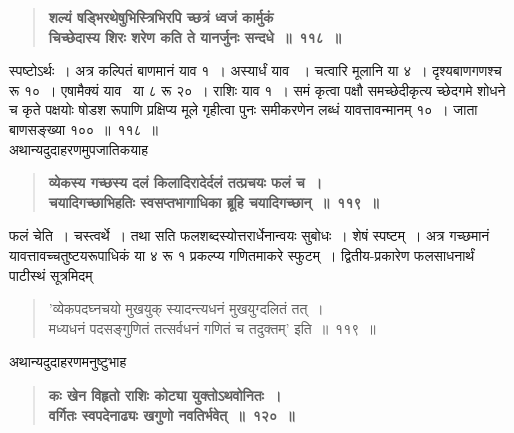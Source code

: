 \documentclass[11pt, openany]{book}
\begin{document}
\newpage

\begin{sloppypar}
 \label{8.118}
\begin{quote}
{\large \textbf{{\color{purple}शल्यं षड्भिरथेषुभिस्त्रिभिरपि च्छत्रं ध्वजं कार्मुकं\\
चिच्छेदास्य शिरः शरेण कति ते यानर्जुनः सन्दधे~॥~११८~॥}}}
\end{quote}

स्पष्टोऽर्थः~। अत्र कल्पितं बाणमानं याव १~। अस्यार्धं याव ~। चत्वारि मूलानि या ४~। दृश्यबाणगणश्च रू १०~। एषामैक्यं याव \, या ८ रू २०~। राशिः याव १~। समं कृत्वा पक्षौ समच्छेदीकृत्य च्छेदगमे शोधने च कृते पक्षयोः षोडश रूपाणि प्रक्षिप्य मूले गृहीत्वा पुनः समीकरणेन लब्धं यावत्तावन्मानम् १०~। जाता बाणसङ्ख्या १००~॥~११८~॥\\

{\small अथान्यदुदाहरणमुपजातिकयाह\textendash }

 \label{8.119}
\begin{quote}
{\large \textbf{{\color{purple}व्येकस्य गच्छस्य दलं किलादिरादेर्दलं तत्प्रचयः फलं च~।\\
चयादिगच्छाभिहतिः स्वसप्तभागाधिका ब्रूहि चयादिगच्छान्~॥~११९~॥}}}
\end{quote}

फलं चेति~। चस्त्वर्थे~। तथा सति फलशब्दस्योत्तरार्धेनान्वयः सुबोधः~। शेषं स्पष्टम्~। अत्र गच्छमानं यावत्तावच्चतुष्टयरूपाधिकं या ४ रू १ प्रकल्प्य गणितमाकरे स्फुटम्~। द्वितीय-प्रकारेण फलसाधनार्थं पाटीस्थं सूत्रमिदम्\textendash

\begin{quote}
{\color{violet}'व्येकपदघ्नचयो मुखयुक् स्यादन्त्यधनं मुखयुग्दलितं तत्~।\\
मध्यधनं पदसङ्गुणितं तत्सर्वधनं गणितं च तदुक्तम्'} इति~॥~११९~॥
\end{quote}

{\small अथान्यदुदाहरणमनुष्टुभाह\textendash }

 \label{8.120}
\begin{quote}
{\large \textbf{{\color{purple}कः खेन विहृतो राशिः कोट्या युक्तोऽथवोनितः~।\\
वर्गितः स्वपदेनाढ्यः खगुणो नवतिर्भवेत्~॥~१२०~॥}}}
\end{quote}


\end{sloppypar}
\end{document}
